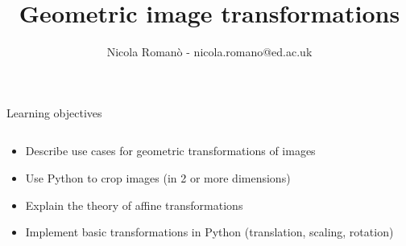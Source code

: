 \documentclass[9pt, aspectratio=169]{beamer}
\author{Nicola Roman\`o - nicola.romano@ed.ac.uk}
\title{Geometric image transformations}
\date{}
\begin{document}

\begin{frame}
    \titlepage
\end{frame}

\begin{frame}
    {Learning objectives}
    \begin{columns}
        \begin{column}{0.8\textwidth}
            \begin{itemize}
                \item Describe use cases for geometric transformations of images
                \item Use Python to crop images (in 2 or more dimensions)
                \item Explain the theory of affine transformations
                \item Implement basic transformations in Python (translation, scaling, rotation)
            \end{itemize}
        \end{column}
        \begin{column}{0.2\textwidth}

\end{column}
\end{columns}
\end{frame}
\end{document}
